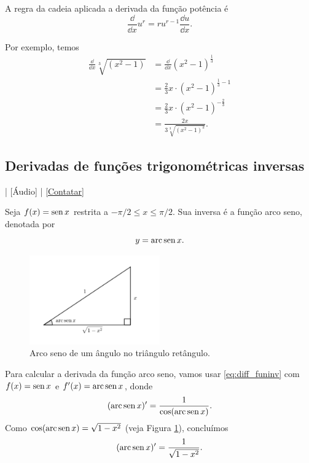 \begin{ex}
  A regra da cadeia aplicada a derivada da função potência é
  \begin{equation}
    \frac{\dd}{\dd x}u^r = ru^{r-1}\frac{\dd u}{\dd x}.
  \end{equation}
  
  Por exemplo, temos
  \begin{align}
    \frac{\dd}{\dd x}\sqrt[3]{(x^2-1)} &= \frac{\dd}{\dd x}(x^2-1)^{\frac{1}{3}} \\
                                       &= \frac{2}{3}x\cdot (x^2-1)^{\frac{1}{3}-1} \\
                                       &= \frac{2}{3}x\cdot (x^2-1)^{-\frac{2}{3}} \\
                                       &= \frac{2x}{3\sqrt[3]{(x^2-1)^2}}.
  \end{align}
\end{ex}

\subsection{Derivadas de funções trigonométricas inversas}

\begin{flushright}
  [Vídeo] | [Áudio] | \href{https://phkonzen.github.io/notas/contato.html}{[Contatar]}
\end{flushright}

Seja $f(x) = \operatorname{sen} x$ restrita a $-\pi/2 \leq x \leq \pi/2$. Sua inversa é a função arco seno, denotada por
\begin{equation}
  y = \operatorname{arc}\operatorname{sen} x.
\end{equation}

\begin{figure}[H]
  \centering
  \includegraphics[width=0.5\textwidth]{./cap_deriv/dados/fig_diff_arc_sen/fig_diff_arc_sen}
  \caption{Arco seno de um ângulo no triângulo retângulo.}
  \label{fig:diff_arc_sen}
\end{figure}

Para calcular a derivada da função arco seno, vamos usar \eqref{eq:diff_funinv} com $f(x)=\operatorname{sen} x$ e $f'(x) = \operatorname{arc}\operatorname{sen} x$, donde
\begin{equation}
  (\operatorname{arc}\operatorname{sen} x)' = \frac{1}{\cos(\operatorname{arc}\operatorname{sen} x)}.
\end{equation}
Como $\cos(\operatorname{arc}\operatorname{sen} x) = \sqrt{1-x^2}$ (veja Figura \ref{fig:diff_arc_sen}), concluímos
\begin{equation}
  (\operatorname{arc}\operatorname{sen} x)' = \frac{1}{\sqrt{1-x^2}}.
\end{equation}


